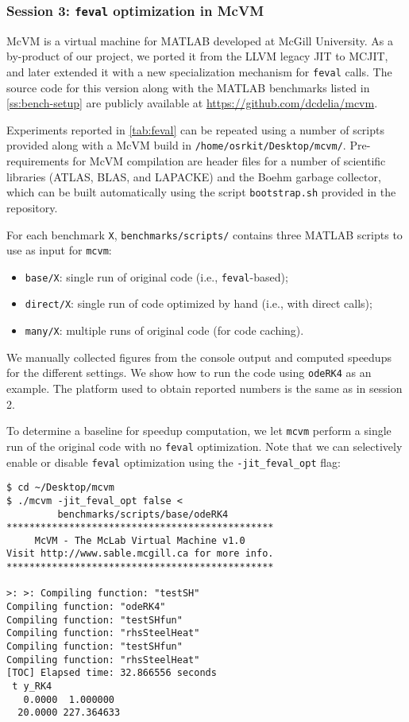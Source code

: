 
\subsubsection{Session 3: {\tt feval} optimization in McVM}

McVM is a virtual machine for MATLAB developed at McGill University. As a by-product of our project, we ported it from the LLVM legacy JIT to MCJIT, and later extended it with a new specialization mechanism for {\tt feval} calls. The source code for this version along with the MATLAB benchmarks listed in \mysection\ref{ss:bench-setup} are publicly available at \url{https://github.com/dcdelia/mcvm}.

Experiments reported in \mytable\ref{tab:feval} can be repeated using a number of scripts provided along with a McVM build in {\small\tt /home/osrkit/Desktop/mcvm/}. Pre-requirements for McVM compilation are header files for a number of scientific libraries (ATLAS, BLAS, and LAPACKE) and the Boehm garbage collector, which can be built automatically using the script {\tt bootstrap.sh} provided in the repository.

For each benchmark {\tt X}, {\small\tt benchmarks/scripts/} contains three MATLAB scripts to use as input for {\tt mcvm}:

\begin{itemize}[parsep=0pt]
\item {\tt base/X}: single run of original code (i.e., {\tt feval}-based);
\item {\tt direct/X}: single run of code optimized by hand (i.e., with direct calls);
\item {\tt many/X}: multiple runs of original code (for code caching).
\end{itemize}

\noindent We manually collected figures from the console output and computed speedups for the different settings. We show how to run the code using {\tt odeRK4} as an example. The platform used to obtain reported numbers is the same as in session 2.

To determine a baseline for speedup computation, we let {\tt mcvm} perform a single run of the original code with no {\tt feval} optimization. Note that we can selectively enable or disable {\tt feval} optimization using the {\tt -jit\_feval\_opt} flag:

\begin{small}
\begin{verbatim}
$ cd ~/Desktop/mcvm
$ ./mcvm -jit_feval_opt false <
         benchmarks/scripts/base/odeRK4
***********************************************
     McVM - The McLab Virtual Machine v1.0     
Visit http://www.sable.mcgill.ca for more info.
***********************************************

>: >: Compiling function: "testSH"
Compiling function: "odeRK4"
Compiling function: "testSHfun"
Compiling function: "rhsSteelHeat"
Compiling function: "testSHfun"
Compiling function: "rhsSteelHeat"
[TOC] Elapsed time: 32.866556 seconds
 t y_RK4
   0.0000  1.000000
  20.0000 227.364633
\end{verbatim}
\end{small}

